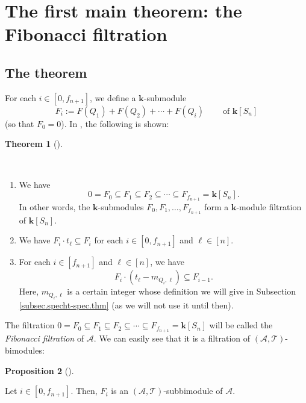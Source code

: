 \documentclass[numbers=enddot,12pt,final,onecolumn,notitlepage]{scrartcl}%
\theoremstyle{definition}
\newtheorem{theo}{Theorem}[section]
\newenvironment{theorem}[1][]
{\begin{theo}[#1]\begin{leftbar}}
{\end{leftbar}\end{theo}}
\newtheorem{prop}[theo]{Proposition}
\newenvironment{proposition}[1][]
{\begin{prop}[#1]\begin{leftbar}}
{\end{leftbar}\end{prop}}
\begin{document}
\section{The first main theorem: the Fibonacci filtration}

\subsection{The theorem}

For each $i\in\left[  0,f_{n+1}\right]  $, we define a $\mathbf{k}$-submodule%
\[
F_{i}:=F\left(  Q_{1}\right)  +F\left(  Q_{2}\right)  +\cdots+F\left(
Q_{i}\right)  \ \ \ \ \ \ \ \ \ \ \text{of }\mathbf{k}\left[  S_{n}\right]
\]
(so that $F_{0}=0$). In \cite[Theorem 8.1]{s2b1}, the following is shown:

\begin{theorem}
\label{thm.t-simultri}\ 

\begin{enumerate}
\item[\textbf{(a)}] We have%
\[
0=F_{0}\subseteq F_{1}\subseteq F_{2}\subseteq\cdots\subseteq F_{f_{n+1}%
}=\mathbf{k}\left[  S_{n}\right]  .
\]
In other words, the $\mathbf{k}$-submodules $F_{0},F_{1},\ldots,F_{f_{n+1}}$
form a $\mathbf{k}$-module filtration of $\mathbf{k}\left[  S_{n}\right]  $.

\item[\textbf{(b)}] We have $F_{i}\cdot t_{\ell}\subseteq F_{i}$ for each
$i\in\left[  0,f_{n+1}\right]  $ and $\ell\in\left[  n\right]  $.

\item[\textbf{(c)}] For each $i\in\left[  f_{n+1}\right]  $ and $\ell
\in\left[  n\right]  $, we have%
\[
F_{i}\cdot\left(  t_{\ell}-m_{Q_{i},\ell}\right)  \subseteq F_{i-1}.
\]
Here, $m_{Q_{i},\ell}$ is a certain integer whose definition we will give in
Subsection \ref{subsec.specht-spec.thm} (as we will not use it until then).
\end{enumerate}
\end{theorem}

The filtration $0=F_{0}\subseteq F_{1}\subseteq F_{2}\subseteq\cdots\subseteq
F_{f_{n+1}}=\mathbf{k}\left[  S_{n}\right]  $ will be called the
\emph{Fibonacci filtration} of $\mathcal{A}$. We can easily see that it is a
filtration of $\left(  \mathcal{A},\mathcal{T}\right)  $-bimodules:

\begin{proposition}
\label{prop.fibfilt.A}Let $i\in\left[  0,f_{n+1}\right]  $. Then, $F_{i}$ is
an $\left(  \mathcal{A},\mathcal{T}\right)  $-subbimodule of $\mathcal{A}$.
\end{proposition}
\end{document}
